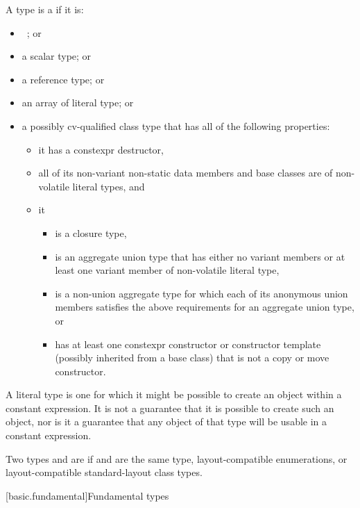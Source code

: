 \pnum
\label{term.literal.type}%
A type is a  if it is:
\begin{itemize}
\item \cv{}~; or
\item a scalar type; or
\item a reference type; or
\item an array of literal type; or
\item a possibly cv-qualified class type that
has all of the following properties:
\begin{itemize}
\item it has a constexpr destructor,
\item all of its non-variant non-static data members and base classes are of non-volatile literal types, and
\item it
\begin{itemize}
\item is a closure type,
\item is an aggregate union type that has either
no variant members or
at least one variant member of non-volatile literal type,
\item is a non-union aggregate type for which
each of its anonymous union members
satisfies the above requirements for an aggregate union type, or
\item has at least one constexpr constructor or constructor template
(possibly inherited from a base class)
that is not a copy or move constructor.
\end{itemize}
\end{itemize}
\end{itemize}
\begin{note}
A literal type is one for which
it might be possible to create an object
within a constant expression.
It is not a guarantee that it is possible to create such an object,
nor is it a guarantee that any object of that type
will be usable in a constant expression.
\end{note}

\pnum
\label{term.layout.compatible.type}%
Two types   and   are
if  and  are the same type,
layout-compatible enumerations, or
layout-compatible standard-layout class types.

[basic.fundamental]{Fundamental types}

